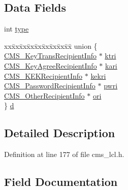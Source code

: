 \subsection*{Data Fields}
\begin{DoxyCompactItemize}
\item 
int \hyperlink{struct_c_m_s___recipient_info__st_ac765329451135abec74c45e1897abf26}{type}
\item 
\begin{tabbing}
xx\=xx\=xx\=xx\=xx\=xx\=xx\=xx\=xx\=\kill
union \{\\
\>\hyperlink{cms__lcl_8h_a9cf59e0f39bf03604b1096dae2d94b5f}{CMS\_KeyTransRecipientInfo} $\ast$ \hyperlink{struct_c_m_s___recipient_info__st_a6d6890f6f234bc481707daf6e139ea4c}{ktri}\\
\>\hyperlink{cms__lcl_8h_ac10c410f89175d84d4f753f32434a937}{CMS\_KeyAgreeRecipientInfo} $\ast$ \hyperlink{struct_c_m_s___recipient_info__st_a1cd33fc1732b3330ba3faaac06845296}{kari}\\
\>\hyperlink{cms__lcl_8h_afa726e7f6dd799ab49866eba897c29b9}{CMS\_KEKRecipientInfo} $\ast$ \hyperlink{struct_c_m_s___recipient_info__st_a20f136eef8addc64a00c0baafef5301f}{kekri}\\
\>\hyperlink{cms__lcl_8h_a8a91002ed5166ed1ab01498f4ce1382b}{CMS\_PasswordRecipientInfo} $\ast$ \hyperlink{struct_c_m_s___recipient_info__st_ad6764854cc62cf01140b539a2ac05a08}{pwri}\\
\>\hyperlink{cms__lcl_8h_a45ba7d9c55339513397c0231aa1d4f90}{CMS\_OtherRecipientInfo} $\ast$ \hyperlink{struct_c_m_s___recipient_info__st_aaa4a86eada3b24968990baedf4434cb3}{ori}\\
\} \hyperlink{struct_c_m_s___recipient_info__st_a37c3f6e5cfb37b122d6194907aa3c721}{d}\\

\end{tabbing}\end{DoxyCompactItemize}


\subsection{Detailed Description}


Definition at line 177 of file cms\+\_\+lcl.\+h.



\subsection{Field Documentation}

